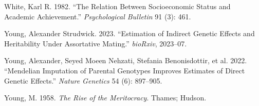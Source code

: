 \documentclass[
  12pt,
]{article}
\newlength{\cslhangindent}
\newenvironment{CSLReferences}[2] %
 {\begin{list}{}{%
  \setlength{\itemindent}{0pt}
  \setlength{\leftmargin}{0pt}
  \setlength{\parsep}{0pt}
  \ifodd #1
   \setlength{\leftmargin}{\cslhangindent}
   \setlength{\itemindent}{-1\cslhangindent}
  \fi
  \setlength{\itemsep}{#2\baselineskip}}}
 {\end{list}}
\theoremstyle{definition}
\theoremstyle{definition}
\theoremstyle{definition}
\theoremstyle{definition}
\theoremstyle{remark}
\begin{document}
\begin{CSLReferences}{1}{1}
White, Karl R. 1982. {``The Relation Between Socioeconomic Status and Academic Achievement.''} \emph{Psychological Bulletin} 91 (3): 461.

Young, Alexander Strudwick. 2023. {``Estimation of Indirect Genetic Effects and Heritability Under Assortative Mating.''} \emph{bioRxiv}, 2023--07.

Young, Alexander, Seyed Moeen Nehzati, Stefania Benonisdottir, et al. 2022. {``Mendelian Imputation of Parental Genotypes Improves Estimates of Direct Genetic Effects.''} \emph{Nature Genetics} 54 (6): 897--905.

Young, M. 1958. \emph{The Rise of the Meritocracy}. Thames; Hudson.

\end{CSLReferences}
\end{document}
